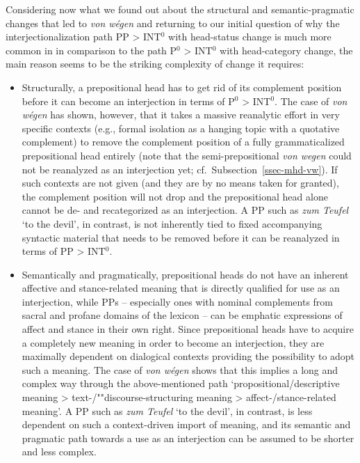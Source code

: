 \documentclass[output=paper
  ,nobabel
  ,draftmode
  ,babelshorthands
  ,colorlinks, citecolor=brown
]{langscibook}
\begin{document}
Considering now what we found out about the structural and semantic\hyp pragmatic changes that led to \emph{von wégen} and returning to our initial question of why the interjectionalization path PP > INT$^0$ with head-status change is much more common in  in comparison to the path P$^0$ > INT$^0$ with head-category change, the main reason seems to be the striking complexity of change it requires:

\begin{itemize}
\item	Structurally, a prepositional head has to get rid of its complement position before it can become an interjection in terms of P$^0$ > INT$^0$. The case of \emph{von wégen} has shown, however, that it takes a massive reanalytic effort in very specific contexts (e.g., formal isolation as a hanging topic with a quotative complement) to remove the complement position of a fully grammaticalized prepositional head entirely (note that the semi-prepositional \emph{von wegen} could not be reanalyzed as an interjection yet; cf.\ Subsection~\ref{ssec-mhd-vw}). If such contexts are not given (and they are by no means taken for granted), the complement position will not drop and the prepositional head alone cannot be de- and recategorized as an interjection. A PP such as \emph{zum Teufel} `to the devil', in contrast, is not inherently tied to fixed accompanying syntactic material that needs to be removed before it can be reanalyzed in terms of PP > INT$^0$.

\largerpage
\item Semantically and pragmatically,  prepositional heads do not have an inherent affective
  and stance-related meaning that is directly qualified for use as an interjection, while PPs –
  especially ones with nominal complements from sacral and profane domains of the lexicon – can
  be emphatic expressions of affect and stance in their own right. Since prepositional heads have to
  acquire a completely new meaning in order to become an interjection, they are maximally dependent
  on dialogical contexts providing the possibility to adopt such a meaning. The case of \emph{von
    wégen} shows that this implies a long and complex way through the above-mentioned path
  `propositional/descriptive meaning > text-/""discourse\hyp structuring meaning > affect-/stance-related meaning'. A PP such as \emph{zum Teufel} `to the devil', in contrast, is less dependent on such a context-driven import of meaning, and its semantic and pragmatic path towards a use as an interjection can be assumed to be shorter and less complex.
\end{itemize}
\end{document}
